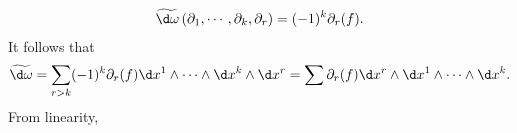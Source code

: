 \documentclass{article}
\begin{document}
\begin{enumerate}
\begin{itemize}
{\begin{align*}
\widetilde{\d \omega}\left(\partial_1, \cdots, \partial_k, \partial_r\right)=(-1)^k \partial_r(f) .
\end{align*}
It follows that
\begin{align*}
\widetilde{\d \omega}=\sum_{r>k}(-1)^k \partial_r(f) \d x^1 \wedge \cdots \wedge \d x^k \wedge \d x^r=\sum \partial_r(f) \d x^r \wedge \d x^1 \wedge \cdots \wedge \d x^k.
\end{align*} 
From linearity,}


\end{itemize}
\end{enumerate}
\end{document}
